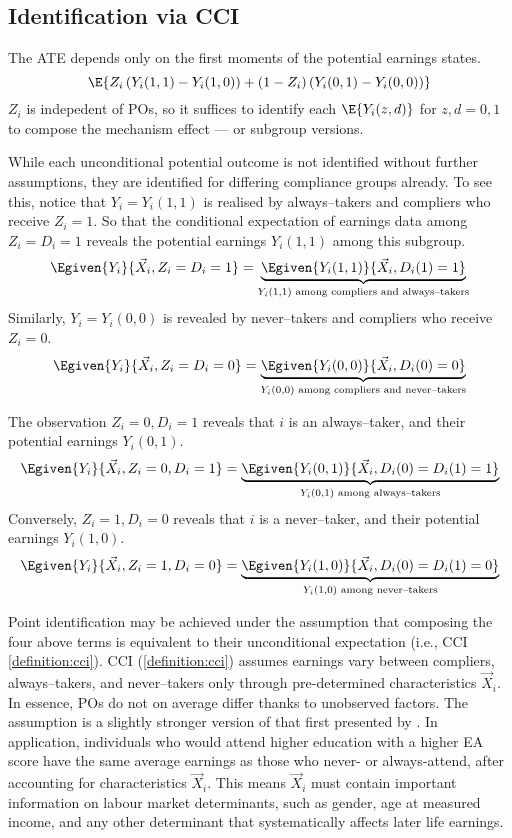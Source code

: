 \subsection{Identification via CCI}
\label{sec:cci-identification}

The ATE depends only on the first moments of the potential earnings states.
\[ \E{ Z_i \left(Y_i(1, 1) - Y_i(1, 0) \right)
    + (1 - Z_i) \left(Y_i(0, 1) - Y_i(0, 0) \right)} \]
$Z_i$ is indepedent of POs, so it suffices to identify each $\E{ Y_i(z, d) }$ for $z,d = 0,1$ to compose the mechanism effect --- or subgroup versions.

While each unconditional potential outcome is not identified without further assumptions, they are identified for differing compliance groups already.
To see this, notice that $Y_i = Y_i(1,1)$ is realised by always--takers and compliers who receive $Z_i = 1$.
So that the conditional expectation of earnings data among $Z_i = D_i = 1$ reveals the potential earnings $Y_i(1,1)$ among this subgroup.
\[ \Egiven{ Y_i }{ \vec X_i, Z_i = D_i = 1}
= \underbrace{\Egiven{ Y_i(1,1) }{ \vec X_i, D_i(1) = 1}}_{
    Y_i(1,1) \text{ among compliers and always--takers}
} \]
Similarly, $Y_i = Y_i(0,0)$ is revealed by never--takers and compliers who receive $Z_i = 0$.
\[ \Egiven{ Y_i }{ \vec X_i, Z_i = D_i = 0}
= \underbrace{\Egiven{ Y_i(0,0) }{ \vec X_i, D_i(0) = 0}}_{
    Y_i(0,0) \text{ among compliers and never--takers}
} \]

The observation $Z_i = 0, D_i = 1$ reveals that $i$ is an always--taker, and their potential earnings $Y_i(0, 1)$.
\[ \Egiven{ Y_i }{ \vec X_i, Z_i = 0, D_i = 1}
= \underbrace{\Egiven{ Y_i(0,1) }{ \vec X_i, D_i(0) = D_i(1) = 1}}_{
    Y_i(0,1) \text{ among always--takers}
} \]
Conversely, $Z_i = 1, D_i = 0$ reveals that $i$ is a never--taker, and their potential earnings $Y_i(1, 0)$.
\[ \Egiven{ Y_i }{ \vec X_i, Z_i = 1, D_i = 0}
= \underbrace{\Egiven{ Y_i(1,0) }{ \vec X_i, D_i(0) = D_i(1) = 0}}_{
    Y_i(1,0) \text{ among never--takers}
} \]

Point identification may be achieved under the assumption that composing the four above terms is equivalent to their unconditional expectation (i.e., CCI \ref{definition:cci}).
CCI (\ref{definition:cci}) assumes earnings vary between compliers, always--takers, and never--takers only through pre-determined characteristics $\vec X_i$.
In essence, POs do not on average differ thanks to unobserved factors.
The assumption is a slightly stronger version of that first presented by \citet[Assumption~3]{angrist2010extrapolate}.
In application, individuals who would attend higher education with a higher EA score have the same average earnings as those who never- or always-attend, after accounting for characteristics $\vec X_i$.
This means $\vec X_i$ must contain important information on labour market determinants, such as gender, age at measured income, and any other determinant that systematically affects later life earnings.

